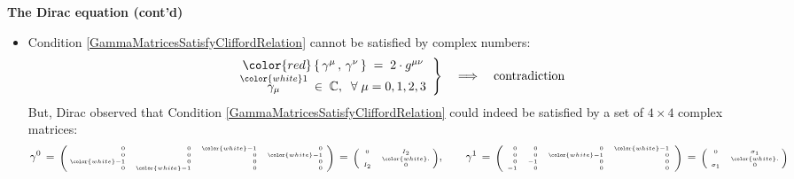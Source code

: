 \begin{frame}{\headingColor\bf\LARGE The Dirac equation (cont'd)}

\scriptsize
\vskip 0.25cm

\begin{itemize}
\item
	Condition \eqref{GammaMatricesSatisfyCliffordRelation} cannot be satisfied by complex numbers:
	\begin{equation*}
	\left.\begin{array}{c}
		{\color{red}\left\{\,\gamma^{\mu}\,,\,\gamma^{\nu}\,\right\} \;=\;2\cdot g^{\mu\nu}}
		\\
		\overset{{\color{white}1}}{\gamma_{\mu}}\;\in\;\C,\;\;\forall\;\mu = 0,1,2,3
	\end{array}\right\}
	\quad\Longrightarrow\quad
	\textnormal{contradiction}
	\end{equation*}
	But, Dirac observed that Condition \eqref{GammaMatricesSatisfyCliffordRelation}
	could indeed be satisfied by a set of {\color{red}$4 \times 4$} complex matrices:
	\begin{equation*}
	\gamma^{0}
	\,=\,
		\textnormal{\tiny$\left(\!\!\begin{array}{rrrr}
			0 & 0 & {\color{white}-}1 & 0 \\
			0 & 0 & 0 & {\color{white}-}1 \\
			{\color{white}-}1 & 0 & 0 & 0 \\
			0 & {\color{white}-}1 & 0 & 0
			\end{array}\!\right)$}
	\,=\,
		\textnormal{\tiny$\left(\!\begin{array}{cc}
			0 & I_{2} \\
			I_{2} & \overset{{\color{white}.}}{0} \\
			\end{array}\!\!\right)$},
	\quad\quad
	\gamma^{1}
	\,=\,
		\textnormal{\tiny$\left(\!\begin{array}{rrrr}
			0 & 0 & 0 & {\color{white}-}1 \\
			0 & 0 & {\color{white}-}1 & 0 \\
			0 & -1 & 0 & 0 \\
			-1 & 0 & 0 & 0
			\end{array}\right)$}
	\,=\,
		\textnormal{\tiny$\left(\!\begin{array}{cc}
			0 & \sigma_{1} \\
			\sigma_{1} & \overset{{\color{white}.}}{0} \\
			\end{array}\!\!\right)$}

\end{equation*}
\end{itemize}
\end{frame}

